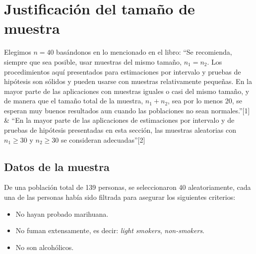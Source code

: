 \documentclass[a4paper]{report}
\begin{document}
\section{Justificación del tamaño de muestra}
Elegimos $n=40$ basándonos en lo mencionado en el libro: ``Se recomienda, siempre que sea posible, usar muestras del mismo tamaño, $n_1 = n_2$. Los procedimientos aquí presentados para estimaciones por intervalo y pruebas de hipótesis son sólidos y pueden usarse con muestras relativamente pequeñas. En la mayor parte de las aplicaciones con muestras iguales o casi del mismo tamaño, y de manera que el tamaño total de la muestra, $n_1 + n_2$, sea por lo menos 20, se esperan muy buenos resultados aun cuando las poblaciones no sean normales.''[1] \& ``En la mayor parte de las aplicaciones de estimaciones por intervalo y de pruebas de hipótesis presentadas en esta sección, las muestras aleatorias con $n_1 \geq 30$ y $n_2 \geq 30$ se consideran adecuadas''[2]

\subsection{Datos de la muestra}
De una población total de 139 personas, se seleccionaron 40 aleatoriamente, cada una de las personas había sido filtrada para asegurar los siguientes criterios: 
\begin{itemize}
    \item No hayan probado marihuana.
    \item No fuman extensamente, es decir: \emph{light smokers}, \emph{non-smokers}.
    \item No son alcohólicos.
\end{itemize}
\end{document}
